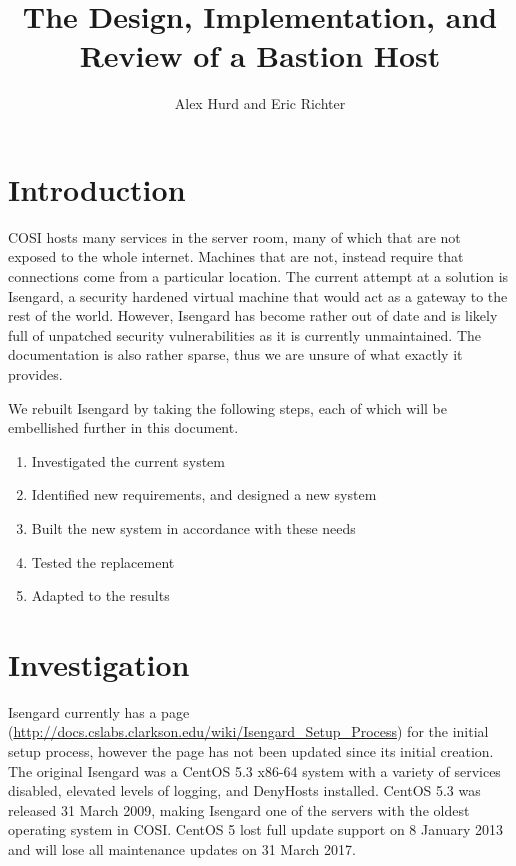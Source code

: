 \documentclass[11pt]{article}
\title{The Design, Implementation, and Review of a Bastion Host}
\author{{Alex Hurd} and {Eric Richter}}
\begin{document}
\maketitle
\newpage
\section*{Introduction}
\begin{paragraph}\indent
COSI hosts many services in the server room, many of which that are not exposed to the whole internet.
Machines that are not, instead require that connections come from a particular location.
The current attempt at a solution is Isengard, a security hardened virtual machine that would act as a gateway to the rest of the world.
However, Isengard has become rather out of date and is likely full of unpatched security vulnerabilities as it is currently unmaintained.
The documentation is also rather sparse, thus we are unsure of what exactly it provides.
\end{paragraph}

\begin{paragraph}\indent
We rebuilt Isengard by taking the following steps, each of which will be embellished further in this document.
\begin{enumerate}
  \item Investigated the current system
  \item Identified new requirements, and designed a new system
  \item Built the new system in accordance with these needs
  \item Tested the replacement
  \item Adapted to the results
\end{enumerate}
\end{paragraph}

\section{Investigation}
\begin{paragraph}\indent
Isengard currently has a page (\url{http://docs.cslabs.clarkson.edu/wiki/Isengard_Setup_Process}) for the initial setup process, however the page has not been updated since its initial creation.
The original Isengard was a CentOS 5.3 x86-64 system with a variety of services disabled, elevated levels of logging, and DenyHosts installed.
CentOS 5.3 was released 31 March 2009, making Isengard one of the servers with the oldest operating system in COSI. CentOS 5 lost full update support on 8 January 2013 and will lose all maintenance updates on 31 March 2017.
\end{paragraph}
\end{document}
